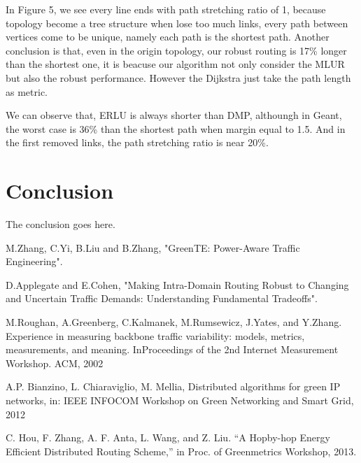 \documentclass[conference]{IEEEtran}
\begin{document}
In Figure 5, we see every line ends with path stretching ratio of 1, because topology become a tree structure when lose too much links,
every path between vertices come to be unique, namely each path is the shortest path. Another conclusion is that, even in the origin
topology, our robust routing is 17\% longer than the shortest one, it is beacuse our algorithm not only consider the MLUR but also
the robust performance. However the Dijkstra just take the path length as metric.

We can observe that, ERLU is always shorter than DMP, althoungh in Geant, the worst case is 36\% than the shortest path when margin
equal to 1.5. And in the first removed links, the path stretching ratio is near 20\%.


\section{Conclusion}
The conclusion goes here.

\begin{thebibliography}{1}

M.Zhang, C.Yi, B.Liu and B.Zhang, "GreenTE: Power-Aware Traffic Engineering".

D.Applegate and E.Cohen, "Making Intra-Domain Routing Robust to Changing and Uncertain Traffic Demands: Understanding Fundamental Tradeoffs".

M.Roughan, A.Greenberg, C.Kalmanek, M.Rumsewicz, J.Yates, and Y.Zhang. Experience in measuring backbone traffic variability: models, metrics, measurements, and meaning. InProceedings of the 2nd Internet Measurement Workshop. ACM, 2002

A.P. Bianzino, L. Chiaraviglio, M. Mellia, Distributed algorithms for green IP networks, in: IEEE INFOCOM Workshop on Green Networking and Smart Grid, 2012

C. Hou, F. Zhang, A. F. Anta, L. Wang, and Z. Liu. “A Hopby-hop Energy Efficient Distributed Routing Scheme,” in Proc. of Greenmetrics Workshop, 2013.

\end{thebibliography}

\appendices
\end{document}
